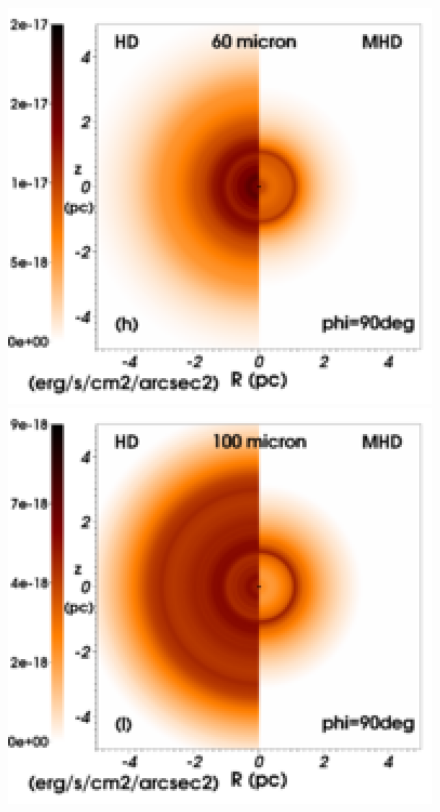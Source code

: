 \documentclass[useAMS,usenatbib]{mn2e}
\begin{document}
\begin{figure}
\begin{minipage}[b]{ 0.32\textwidth}
	\end{minipage}
	\begin{minipage}[b]{ 0.32\textwidth}
			\centering
	        \includegraphics[width=1.0\textwidth]{./map_2040_90deg_lambda60_legend.eps}
	\end{minipage}	
	\begin{minipage}[b]{ 0.32\textwidth}
	      \centering
	        \includegraphics[width=1.0\textwidth]{./map_2040_90deg_lambda100_legend.eps}

\end{minipage}
\end{figure}
\end{document}

